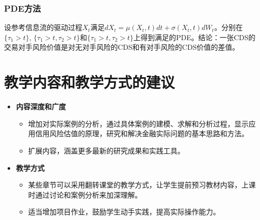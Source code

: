 \documentclass{article}
\begin{document}
\subsubsection*{PDE方法}

设参考信息流的驱动过程$X_t$满足$dX_t = \mu(X_t,t)dt +\sigma(X_t,t)dW_t$。分别在$\{\tau_1 > t\}$, $\{\tau_1 > t,\tau_2>t\}$和$\{\tau_1>t,\tau_2>t\}$上得到满足的PDE。结论：一张CDS的交易对手风险价值是对无对手风险的CDS和有对手风险的CDS价值的差值。


\section{教学内容和教学方式的建议}

\begin{itemize}
    \item \textbf{内容深度和广度}
    \begin{itemize}
        \item 增加对实际案例的分析，通过具体案例的建模、求解和分析过程，显示应用信用风险估值的原理，研究和解决金融实际问题的基本思路和方法。
        \item 扩展内容，涵盖更多最新的研究成果和实践工具。
    \end{itemize}
    
    \item \textbf{教学方式}
    \begin{itemize}
        \item 某些章节可以采用翻转课堂的教学方式，让学生提前预习教材内容，上课时通过讨论和案例分析来加深理解。
        \item 适当增加项目作业，鼓励学生动手实践，提高实际操作能力。
    \end{itemize}
\end{itemize}



 
\end{document}
